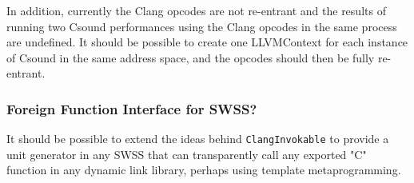 \documentclass[letterpaper, 12pt]{article}
\begin{document}
In addition, currently the Clang opcodes are not re-entrant and the results of running two Csound performances using the Clang opcodes in the same process are undefined. It should be possible to create one LLVMContext for each instance of Csound in the same address space, and the opcodes should then be fully re-entrant.

\subsubsection{Foreign Function Interface for SWSS?}

It should be possible to extend the ideas behind \verb|ClangInvokable| to provide a unit generator in any SWSS that can transparently call any exported "C" function in any dynamic link library, perhaps using template metaprogramming.



\end{document}
